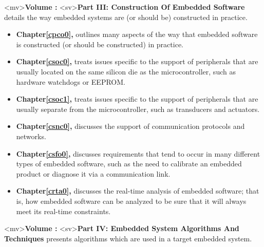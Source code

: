 <mv>\textbf{Volume \vcswzeroroman{}:  \vcswzerotitle{}}
<sv>\textbf{Part III:  Construction Of Embedded Software}
details the way embedded systems are (or should be)
constructed in practice.
\begin{itemize}
\item \textbf{Chapter\;\ref{cpco0}, \cpcozerotitle{}} outlines many aspects of
      the way that embedded software is constructed (or should be constructed) 
      in practice.

\item \textbf{Chapter\;\ref{csoc0}, \csoczerotitle{}} treats issues specific to 
      the support of peripherals that are usually located on the same silicon
      die as the microcontroller, such as hardware watchdogs or EEPROM.

\item \textbf{Chapter\;\ref{csoc1}, \csoconetitle{}} treats issues specific to 
      the support of peripherals that are usually separate from the microcontroller,
      such as transducers and actuators.

\item \textbf{Chapter\;\ref{csnc0}, \csnczerotitle{}} discusses the support
      of communication protocols and networks.

\item \textbf{Chapter\;\ref{csfo0}, \csfozerotitle{}} discusses requirements
      that tend to occur in many different types of embedded software,
      such as the need to calibrate an embedded product or diagnose it
      via a communication link.

\item \textbf{Chapter\;\ref{crta0}, \crtazerotitle{}} discusses the real-time
      analysis of embedded software; that is, how embedded software can be
      analyzed to be sure that it will always meet its real-time constraints.
\end{itemize}


<mv>\textbf{Volume \valgzeroroman{}: \valgzerotitle{}} 
<sv>\textbf{Part IV:  Embedded System Algorithms And Techniques}
presents algorithms which are used in a target embedded system.

